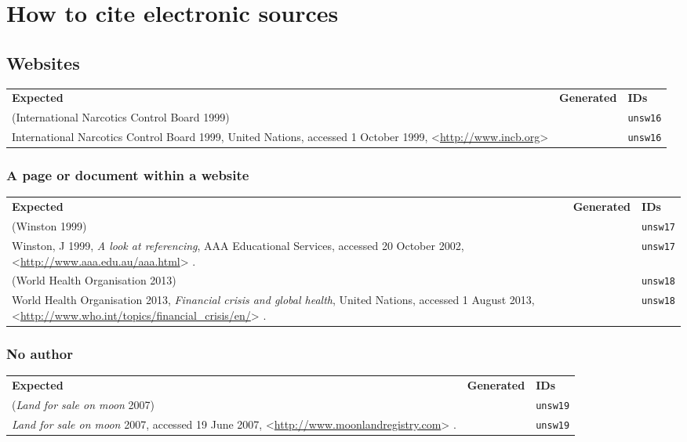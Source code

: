 \documentclass[a4paper,landscape,12pt]{article}
\newlength\q
\newlength\qr
\newenvironment{citetable}
  {\noindent\begin{longtable}{p{\q} p{\q} p{\qr}}\textbf{Expected} & \textbf{Generated} & \textbf{IDs}\\}
  {\end{longtable}}
\newcommand{\citeurlex}[1]{%
  \let\oldurlfont\UrlFont%
  \def\UrlFont{}%
  \textless\url{#1}\textgreater%
  \let\UrlFont\oldurlfont}
\begin{document}
\section{How to cite electronic sources}

\subsection{Websites}

\begin{citetable}
	(International Narcotics Control Board 1999) & \parencite{unsw16} & \texttt{unsw16} \\
	International Narcotics Control Board 1999, United Nations, accessed 1 October 1999, \citeurlex{http://www.incb.org} & \fullcite{unsw16} & \texttt{unsw16} \\
\end{citetable}

\subsubsection{A page or document within a website}

\begin{citetable}
	(Winston 1999) & \parencite{unsw17} & \texttt{unsw17} \\
	Winston, J 1999, \textit{A look at referencing}, AAA Educational Services, accessed 20 October 2002, \citeurlex{http://www.aaa.edu.au/aaa.html}. & \fullcite{unsw17} & \texttt{unsw17} \\
	(World Health Organisation 2013) & \parencite{unsw18} & \texttt{unsw18} \\
	World Health Organisation 2013, \textit{Financial crisis and global health}, United Nations, accessed 1 August 2013, \citeurlex{http://www.who.int/topics/financial\_crisis/en/}. & \fullcite{unsw18} & \texttt{unsw18} \\
\end{citetable}

\subsubsection{No author}

\begin{citetable}
	(\textit{Land for sale on moon} 2007) & \parencite{unsw19} & \texttt{unsw19} \\
	\textit{Land for sale on moon} 2007, accessed 19 June 2007, \citeurlex{http://www.moonlandregistry.com}. & \fullcite{unsw19} & \texttt{unsw19} \\
\end{citetable}
\end{document}
